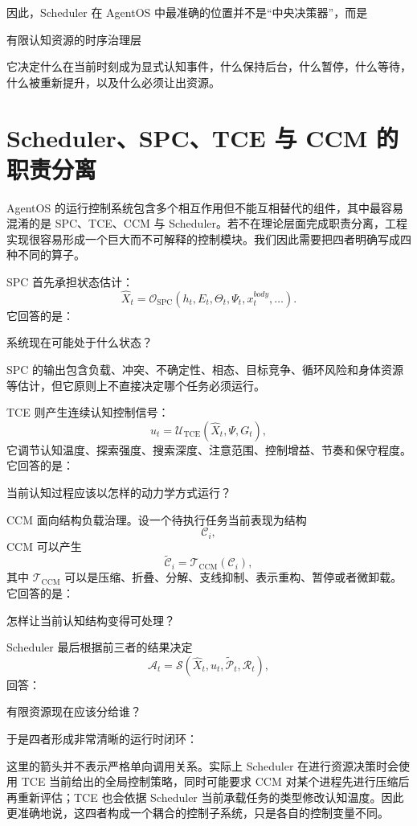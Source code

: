 因此，Scheduler 在 AgentOS 中最准确的位置并不是“中央决策器”，而是
\begin{statementbox}
有限认知资源的时序治理层
\end{statementbox}
它决定什么在当前时刻成为显式认知事件，什么保持后台，什么暂停，什么等待，什么被重新提升，以及什么必须让出资源。

\section{Scheduler、SPC、TCE 与 CCM 的职责分离}

AgentOS 的运行控制系统包含多个相互作用但不能互相替代的组件，其中最容易混淆的是 SPC、TCE、CCM 与 Scheduler。若不在理论层面完成职责分离，工程实现很容易形成一个巨大而不可解释的控制模块。我们因此需要把四者明确写成四种不同的算子。

SPC 首先承担状态估计：
\[
\widehat X_t
=
\mathcal O_{\mathrm{SPC}}
(
h_t,
E_t,
\Theta_t,
\Psi_t,
x_t^{body},
\ldots
).
\]
它回答的是：
\begin{statementbox}
系统现在可能处于什么状态？
\end{statementbox}
SPC 的输出包含负载、冲突、不确定性、相态、目标竞争、循环风险和身体资源等估计，但它原则上不直接决定哪个任务必须运行。

TCE 则产生连续认知控制信号：
\[
u_t
=
\mathcal U_{\mathrm{TCE}}
(
\widehat X_t,
\Psi,
G_t
),
\]
它调节认知温度、探索强度、搜索深度、注意范围、控制增益、节奏和保守程度。它回答的是：
\begin{remark}
当前认知过程应该以怎样的动力学方式运行？
\end{remark}

CCM 面向结构负载治理。设一个待执行任务当前表现为结构
\[
\mathcal C_i,
\]
CCM 可以产生
\[
\widetilde{\mathcal C}_i
=
\mathcal T_{\mathrm{CCM}}(\mathcal C_i),
\]
其中 $\mathcal T_{\mathrm{CCM}}$ 可以是压缩、折叠、分解、支线抑制、表示重构、暂停或者微卸载。它回答的是：
\begin{statementbox}
怎样让当前认知结构变得可处理？
\end{statementbox}

Scheduler 最后根据前三者的结果决定
\[
\mathcal A_t
=
\mathcal S(
\widehat X_t,
u_t,
\widetilde{\mathcal P}_t,
\mathcal R_t
),
\]
回答：
\begin{statementbox}
有限资源现在应该分给谁？
\end{statementbox}

于是四者形成非常清晰的运行时闭环：
\begin{statementbox}
\centering
{}
\end{statementbox}
这里的箭头并不表示严格单向调用关系。实际上 Scheduler 在进行资源决策时会使用 TCE 当前给出的全局控制策略，同时可能要求 CCM 对某个进程先进行压缩后再重新评估；TCE 也会依据 Scheduler 当前承载任务的类型修改认知温度。因此更准确地说，这四者构成一个耦合的控制子系统，只是各自的控制变量不同。

